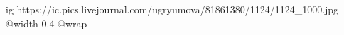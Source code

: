  
 
 
 
 

\ifcmt
  ig https://ic.pics.livejournal.com/ugryumova/81861380/1124/1124_1000.jpg
  @width 0.4
  @wrap 
\fi
